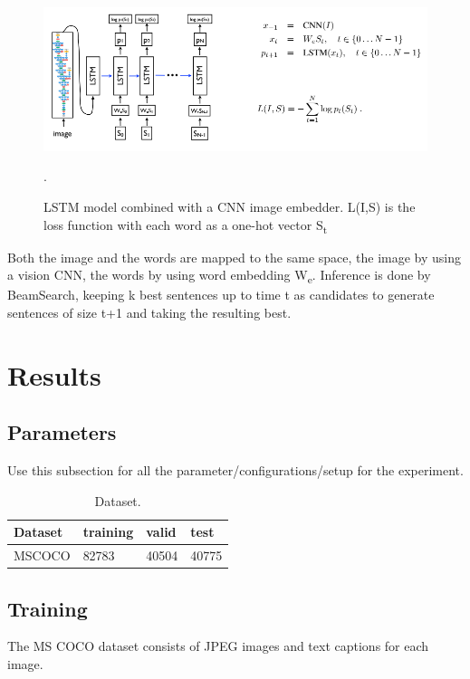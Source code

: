 \begin{figure}[ht!]
\centering
\includegraphics[width=1\textwidth]{assets/model.png}
\caption{\label{fig:model}LSTM model combined with a CNN image embedder. L(I,S) is the loss function with each word as a one-hot vector S\textsubscript{t}}.
\end{figure}

Both the image and the words are mapped to the same space, the image by using a vision CNN, the words by using word embedding W\textsubscript{e}. Inference is done by BeamSearch, keeping k best sentences up to time t as candidates to generate sentences of size t+1 and taking the resulting best.

\section{Results}
\label{sec:results}

\subsection{Parameters}
Use this subsection for all the parameter/configurations/setup for the experiment.
\begin{table}[h!]
\centering
\begin{tabular}{l|l|l|l}
Dataset & training & valid & test  \\\hline
MSCOCO & 82783 & 40504 & 40775\\
\end{tabular}
\caption{\label{tab:dataset}Dataset.}
\label{tab:dataset}
\end{table}

\subsection{Training}
The MS COCO dataset consists of JPEG images and text captions for each image.


